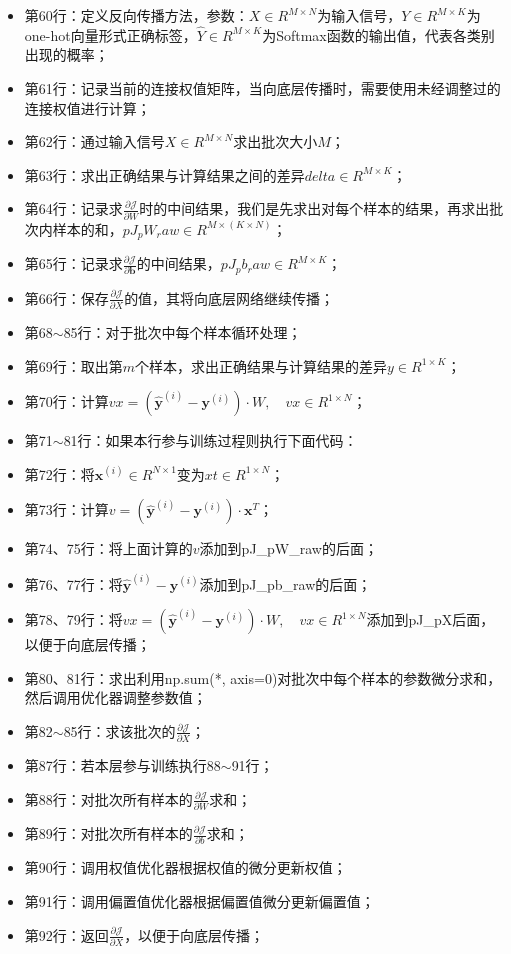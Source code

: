 \documentclass[UTF8]{article}
\begin{document}
\begin{itemize}
\item 第60行：定义反向传播方法，参数：$X \in R^{M \times N}$为输入信号，$Y \in R^{M \times K}$为one-hot向量形式正确标签，$\hat{Y} \in R^{M \times K}$为Softmax函数的输出值，代表各类别出现的概率；
\item 第61行：记录当前的连接权值矩阵，当向底层传播时，需要使用未经调整过的连接权值进行计算；
\item 第62行：通过输入信号$X \in R^{M \times N}$求出批次大小$M$；
\item 第63行：求出正确结果与计算结果之间的差异$delta \in R^{M \times K}$；
\item 第64行：记录求$\frac{\partial{\mathcal{J}}}{\partial{W}}$时的中间结果，我们是先求出对每个样本的结果，再求出批次内样本的和，$pJ_pW_raw \in R^{M \times (K \times N)}$；
\item 第65行：记录求$\frac{\partial{\mathcal{J}}}{\partial{\boldsymbol{b}}}$的中间结果，$pJ_pb_raw \in R^{M \times K}$；
\item 第66行：保存$\frac{\partial{\mathcal{J}}}{\partial{X}}$的值，其将向底层网络继续传播；
\item 第68$\sim$85行：对于批次中每个样本循环处理；
\item 第69行：取出第$m$个样本，求出正确结果与计算结果的差异$y \in R^{1 \times K}$；
\item 第70行：计算$vx=(\hat{\boldsymbol{y}}^{(i)}-\boldsymbol{y}^{(i)}) \cdot W, \quad vx \in R^{1 \times N}$；
\item 第71$\sim$81行：如果本行参与训练过程则执行下面代码：
\item 第72行：将$\boldsymbol{x}^{(i)} \in R^{N \times 1}$变为$xt \in R^{1 \times N}$；
\item 第73行：计算$v = (\hat{\boldsymbol{y}}^{(i)}-\boldsymbol{y}^{(i)}) \cdot \boldsymbol{x}^{T}$；
\item 第74、75行：将上面计算的$v$添加到pJ\_pW\_raw的后面；
\item 第76、77行：将$\hat{\boldsymbol{y}}^{(i)}-\boldsymbol{y}^{(i)}$添加到pJ\_pb\_raw的后面；
\item 第78、79行：将$vx=(\hat{\boldsymbol{y}}^{(i)}-\boldsymbol{y}^{(i)}) \cdot W, \quad vx \in R^{1 \times N}$添加到pJ\_pX后面，以便于向底层传播；
\item 第80、81行：求出利用np.sum(*, axis=0)对批次中每个样本的参数微分求和，然后调用优化器调整参数值；
\item 第82$\sim$85行：求该批次的$\frac{\partial{\mathcal{J}}}{\partial{X}}$；
\item 第87行：若本层参与训练执行88$\sim$91行；
\item 第88行：对批次所有样本的$\frac{\partial{\mathcal{J}}}{\partial{W}}$求和；
\item 第89行：对批次所有样本的$\frac{\partial{\mathcal{J}}}{\partial{b}}$求和；
\item 第90行：调用权值优化器根据权值的微分更新权值；
\item 第91行：调用偏置值优化器根据偏置值微分更新偏置值；
\item 第92行：返回$\frac{\partial{\mathcal{J}}}{\partial{X}}$，以便于向底层传播；
\end{itemize}
\end{document}
